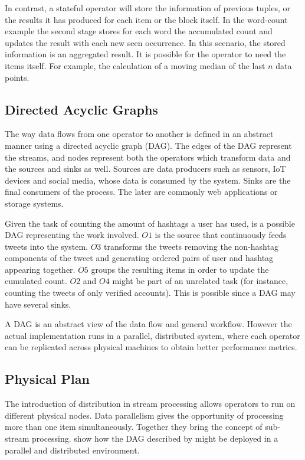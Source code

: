   In contrast, a stateful operator will store the information of previous
  tuples, or the results it has produced for each item or the block itself. In
  the word-count example the second stage stores for each word the accumulated
  count and updates the result with each new seen occurrence. In this scenario,
  the stored information is an aggregated result. It is possible for the
  operator to need the items itself. For example, the calculation of a moving
  median of the last $n$ data points.

  \subsection{Directed Acyclic Graphs}
  The way data flows from one operator to another is defined in an abstract
  manner using a directed acyclic graph (DAG). The edges of the DAG represent
  the streams, and nodes represent both the operators which transform data and
  the sources and sinks as well. Sources are data producers such as sensors,
  IoT devices and social media, whose data is consumed by the system. Sinks are
  the final consumers of the process. The later are commonly web applications
  or storage systems.


  Given the task of counting the amount of hashtags a user has used,
   is a possible DAG representing the work involved. $O1$ is the
  source that continuously feeds tweets into the system. $O3$ transforms the
  tweets removing the non-hashtag components of the tweet and generating
  ordered pairs of user and hashtag appearing together. $O5$ groups the
  resulting items in order to update the cumulated count. $O2$ and $O4$ might
  be part of an unrelated task (for instance, counting the tweets of only
  verified accounts). This is possible since a DAG may have several sinks.

  A DAG is an abstract view of the data flow and general workflow. However the
  actual implementation runs in a parallel, distributed system, where each
  operator can be replicated across physical machines to obtain better
  performance metrics.

  \subsection{Physical Plan}
  The introduction of distribution in stream processing allows operators to run
  on different physical nodes. Data parallelism gives the opportunity of
  processing more than one item simultaneously. Together they bring the concept
  of sub-stream processing.  show how the DAG described
  by  might be deployed in a parallel and distributed environment.

